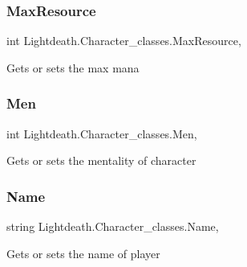 \subsubsection{\texorpdfstring{Max\+Resource}{MaxResource}}
{\footnotesize\ttfamily int Lightdeath.\+Character\+\_\+classes.\+Max\+Resource\hspace{0.3cm}{\ttfamily [get]}, {\ttfamily [set]}}



Gets or sets the max mana 

\hypertarget{class_lightdeath_1_1_character__classes_ac2e52f208728995cebaea78d0061f646}{}\label{class_lightdeath_1_1_character__classes_ac2e52f208728995cebaea78d0061f646} 
\subsubsection{\texorpdfstring{Men}{Men}}
{\footnotesize\ttfamily int Lightdeath.\+Character\+\_\+classes.\+Men\hspace{0.3cm}{\ttfamily [get]}, {\ttfamily [set]}}



Gets or sets the mentality of character 

\hypertarget{class_lightdeath_1_1_character__classes_a7d0d9e96297782253c9f7b22276a1b3b}{}\label{class_lightdeath_1_1_character__classes_a7d0d9e96297782253c9f7b22276a1b3b} 
\subsubsection{\texorpdfstring{Name}{Name}}
{\footnotesize\ttfamily string Lightdeath.\+Character\+\_\+classes.\+Name\hspace{0.3cm}{\ttfamily [get]}, {\ttfamily [set]}}



Gets or sets the name of player 

\hypertarget{class_lightdeath_1_1_character__classes_a146137183b0215163ac6605df6613c7c}{}\label{class_lightdeath_1_1_character__classes_a146137183b0215163ac6605df6613c7c} 
